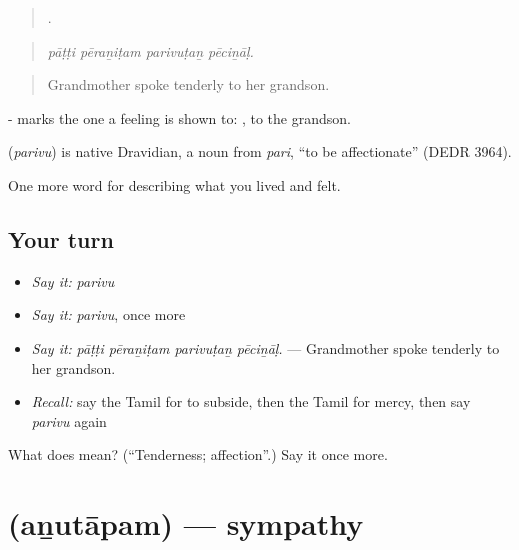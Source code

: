\begin{quote}
   .
\end{quote}

\begin{quote}
\emph{pāṭṭi pēraṉiṭam parivuṭaṉ pēciṉāḷ.}
\end{quote}

\begin{quote}
Grandmother spoke tenderly to her grandson.
\end{quote}

- marks the one a feeling is shown to: , to the grandson.

\begin{cousinweb}
\textbf{} (\emph{parivu}) is native Dravidian, a noun from  \emph{pari}, \textquotedblleft{}to be affectionate\textquotedblright{} (DEDR 3964).
\end{cousinweb}

\begin{grammarlens}[title={What you've built}]
One more word for describing what you lived and felt.
\end{grammarlens}

\subsection*{Your turn}
\begin{itemize}
\raggedright
  \item \emph{Say it:} \emph{parivu}
  \item \emph{Say it:} \emph{parivu}, once more
  \item \emph{Say it:} \emph{pāṭṭi pēraṉiṭam parivuṭaṉ pēciṉāḷ.} — Grandmother spoke tenderly to her grandson.
  \item \emph{Recall:} say the Tamil for to subside, then the Tamil for mercy, then say \emph{parivu} again
\end{itemize}

\begin{tcolorbox}[breakable,colback=teal!4,colframe=teal!35!black,title={Before you move on}]
What does  mean? (\textquotedblleft{}Tenderness; affection\textquotedblright{}.) Say it once more.
\end{tcolorbox}
\section[\texorpdfstring{\ta{அனுதாபம்} (aṉutāpam)}{அனுதாபம் (aṉutāpam)}]{ (aṉutāpam) — sympathy}

